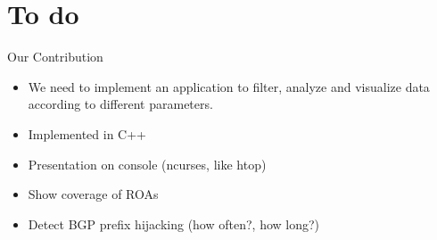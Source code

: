 \documentclass[ucs,9pt]{beamer}
\begin{document}
\section{To do}

\begin{frame}{Our Contribution}

  \begin{itemize}
    \item We need to implement an application to filter, analyze and visualize data according to different parameters.
    \item Implemented in C++
    \item Presentation on console (ncurses, like htop)  
    \item Show coverage of ROAs
    \item Detect BGP prefix hijacking (how often?, how long?)
  \end{itemize}
    
\end{frame}
\end{document}

